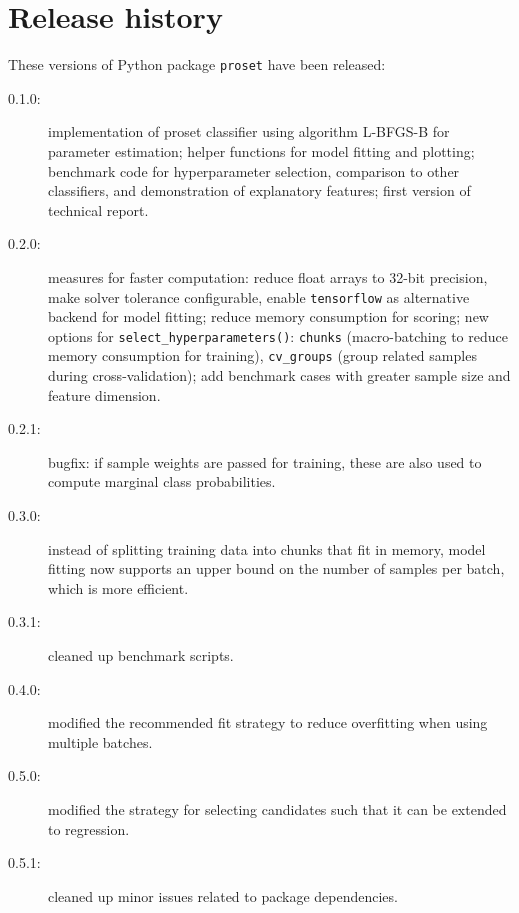 \section{Release history}
\label{sec_release_history}
%
These versions of Python package \texttt{proset} have been released:
%
\begin{description}
\item[0.1.0:] implementation of proset classifier using algorithm L-BFGS-B \cite{Byrd_95} for parameter estimation;
helper functions for model fitting and plotting;
benchmark code for hyperparameter selection, comparison to other classifiers, and demonstration of explanatory features;
first version of technical report.
%
\item[0.2.0:] measures for faster computation: reduce float arrays to 32-bit precision, make solver tolerance configurable,
enable \texttt{tensorflow} \cite{Abadi_15} as alternative backend for model fitting;
reduce memory consumption for scoring;
new options for \texttt{select\_hyperparameters()}: \texttt{chunks} (macro-batching to reduce memory consumption for training), \texttt{cv\_groups} (group related samples during cross-validation);
add benchmark cases with greater sample size and feature dimension.
%
\item[0.2.1:] bugfix: if sample weights are passed for training, these are also used to compute marginal class probabilities.
%
\item[0.3.0:] instead of splitting training data into chunks that fit in memory, model fitting now supports an upper bound
on the number of samples per batch, which is more efficient.
%
\item[0.3.1:] cleaned up benchmark scripts.
%
\item[0.4.0:] modified the recommended fit strategy to reduce overfitting when using multiple batches.
%
\item[0.5.0:] modified the strategy for selecting candidates such that it can be extended to regression.
%
\item[0.5.1:] cleaned up minor issues related to package dependencies.
\end{description}
%
\endinput
